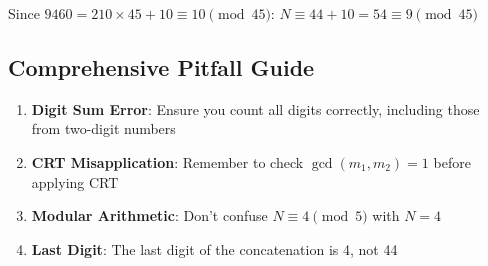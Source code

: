 \documentclass[11pt]{article}
\begin{document}
\begin{solutionbox}
Since $9460 = 210 \times 45 + 10 \equiv 10 \pmod{45}$:
$N \equiv 44 + 10 = 54 \equiv 9 \pmod{45}$

\subsection*{Comprehensive Pitfall Guide}
\begin{enumerate}
    \item \textbf{Digit Sum Error}: Ensure you count all digits correctly, including those from two-digit numbers
    \item \textbf{CRT Misapplication}: Remember to check $\gcd(m_1, m_2) = 1$ before applying CRT
    \item \textbf{Modular Arithmetic}: Don't confuse $N \equiv 4 \pmod{5}$ with $N = 4$
    \item \textbf{Last Digit}: The last digit of the concatenation is 4, not 44
\end{enumerate}
\end{solutionbox}
\end{document}
